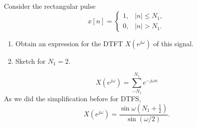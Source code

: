 \begin{frame}
    {
        \begin{figure}
            \centering
            
        \end{figure}

    }
\end{frame}


\begin{frame}
    \begin{example}
        Consider the rectangular pulse
        \begin{equation*}
            x[n] = \begin{cases}
                1, & |n| \leq N_1,\\
                0, & |n| > N_1.
            \end{cases}
        \end{equation*}
        \begin{enumerate}
            \item Obtain an expression for the DTFT $X(e^{j\omega})$ of this signal.
            \item Sketch for $N_1 = 2$.
        \end{enumerate}
     \end{example}

        \begin{figure}
            \centering
            
        \end{figure}

\end{frame}

\begin{frame}
	\begin{equation*}
		X(e^{j\omega}) = \sum_{-N_1}^{N_1}e^{-j\omega n}
	\end{equation*}
	As we did the simplification before for DTFS,
	\pause
	\begin{equation*}
		X(e^{j\omega}) = \frac{\sin\omega \left(N_1 + \frac{1}{2}\right)}{\sin(\omega/2)}.
	\end{equation*}
\end{frame}



\begin{frame}[plain]

    \begin{figure}
        \centering
        
    \end{figure}
\end{frame}



